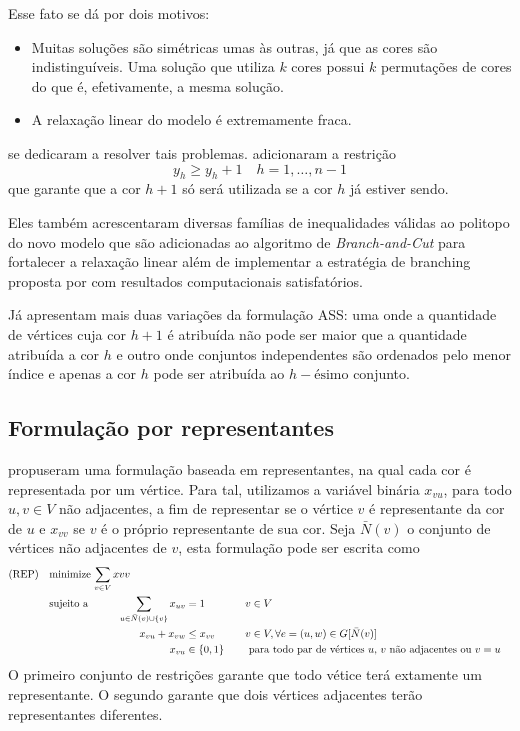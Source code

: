 \documentclass[11pt]{article}
\begin{document}
Esse fato se dá por dois motivos:
\begin{itemize}
\item Muitas soluções são simétricas umas às outras, já que as cores são indistinguíveis. Uma solução que utiliza \(k\) cores possui \(k\) permutações de cores do que é, efetivamente, a mesma solução.
\item A relaxação linear do modelo é extremamente fraca.
\end{itemize}

\textcites{MendezDiaz2006BranchCutAlgorithm}[][]{MendezDiaz2008CuttingPlaneAlgorithm} se dedicaram a resolver tais problemas.
\textcite{MendezDiaz2006BranchCutAlgorithm} adicionaram a restrição
\[ y_h \geq y_h+1 \quad h = 1, \dots, n-1 \]
que garante que a cor \(h+1\) só será utilizada se a cor \(h\) já estiver sendo.

Eles também acrescentaram diversas famílias de inequalidades válidas ao politopo do novo modelo que são adicionadas ao algoritmo de \emph{Branch-and-Cut}  para fortalecer a relaxação linear além de implementar a estratégia de branching proposta por \textcite{Brelaz1979Newmethodscolor} com resultados computacionais satisfatórios.

Já \textcite{MendezDiaz2008CuttingPlaneAlgorithm} apresentam mais duas variações da formulação ASS: uma onde a quantidade de vértices cuja cor \(h+1\) é atribuída não pode ser maior que a quantidade atribuída a cor \(h\) e outro onde conjuntos independentes são ordenados pelo menor índice e apenas a cor \(h\) pode ser atribuída ao \(h-\text{ésimo}\) conjunto.

\subsection{Formulação por representantes}
\label{sec:org0074dc0}
\textcite{Campelo2004CliquesHolesVertex} propuseram uma formulação baseada em representantes, na qual cada cor é representada por um vértice.
Para tal, utilizamos a variável binária \(x_{vu}\), para todo \(u, v \in V\) não adjacentes, a fim de representar se o vértice \(v\) é representante da cor de \(u\) e \(x_{vv}\) se \(v\) é o próprio representante de sua cor.
Seja \(\bar{N}(v)\) o conjunto de vértices não adjacentes de \(v\), esta formulação pode ser escrita como
\begin{alignat*}{4}
\mathrm{(REP)} \quad & \omit\rlap{minimize  $\displaystyle \sum_{v \in V} x{vv}$} \\
& \mbox{sujeito a}&& \quad & \sum_{u \in \bar{N}(v) \cup \{v\}} x_{uv}&= 1        & \quad & v \in V \\
&                 &&   & x_{vu} + x_{vw}    & \leq x_{vv} &   & v \in V, \forall e = (u,w) \in G[\bar{N}(v)] \\
&                 &&   & x_{vu}       & \in \{0,1\} &   & \text{ para todo par de vértices $u$, $v$ não adjacentes ou $v = u$}
\end{alignat*}
O primeiro conjunto de restrições garante que todo vétice terá extamente um representante.
O segundo garante que dois vértices adjacentes terão representantes diferentes.
\end{document}
